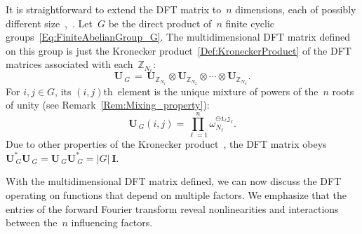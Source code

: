 \documentclass[letterpaper,11pt]{article}
\newcommand{\bs}[1]{{\boldsymbol{#1}}}
\newcommand{\gr}[1]{( #1 )}
\newcommand{\abs}[1]{\vert #1 \vert}
\newcommand{\Int}{\mathbb Z}
\newcommand{\bcode}[1]{\texttt{#1}}
\newcommand{\ijth}{$(i,j)$th}
\theoremstyle{definition} \newtheorem{remark}{Remark}
\begin{document}
It is straightforward to extend the DFT matrix to~$n$ dimensions, each of possibly different size~\cite[\S11]{good1958interaction},~\cite[Ch.~10]{terras1999FourierAnalysisFiniteGroups}. Let~$G$ be the direct product of~$n$ finite cyclic groups~\eqref{Eq:FiniteAbelianGroup_G}. The multidimensional DFT matrix defined on this group is just the Kronecker product~\eqref{Def:KroneckerProduct} of the DFT matrices associated with each~$\Int_{N_\ell}$:
\begin{equation} \label{Eq:Multidim_U_G}
\bs{U}_{\:\!\!G} \,=\, \bs{U}_{\Int_{N_1}} \otimes \bs{U}_{\Int_{N_2}} \otimes \cdots \otimes  \bs{U}_{\Int_{N_n}}.
\end{equation}
For $i,j\in G$, its \ijth\ element is the unique mixture of powers of the~$n$ roots of unity (see Remark~\ref{Rem:Mixing_property}):
\begin{equation} \label{Eq:U_G(i,j)}
\bs{U}_{\:\!\!G}\gr{i,j} = \prod_{\ell=1}^n \omega_{N_\ell}^{\ominus\bcode{i}_\ell\bcode{j}_\ell}.
\end{equation}
Due to other properties of the Kronecker product~\cite[\S4.2]{horn1994topics}, the DFT matrix obeys $\bs{U}_{\:\!\!G}^* \bs{U}_{\:\!\!G} =
\bs{U}_{\:\!\!G} \bs{U}_{\:\!\!G}^* = \abs{G}\:\!\bs{I}$.

With the multidimensional DFT matrix defined, we can now discuss the DFT operating on functions that depend on multiple factors. We emphasize that the entries of the forward Fourier transform reveal nonlinearities and interactions between the~$n$ influencing factors.
\end{document}

